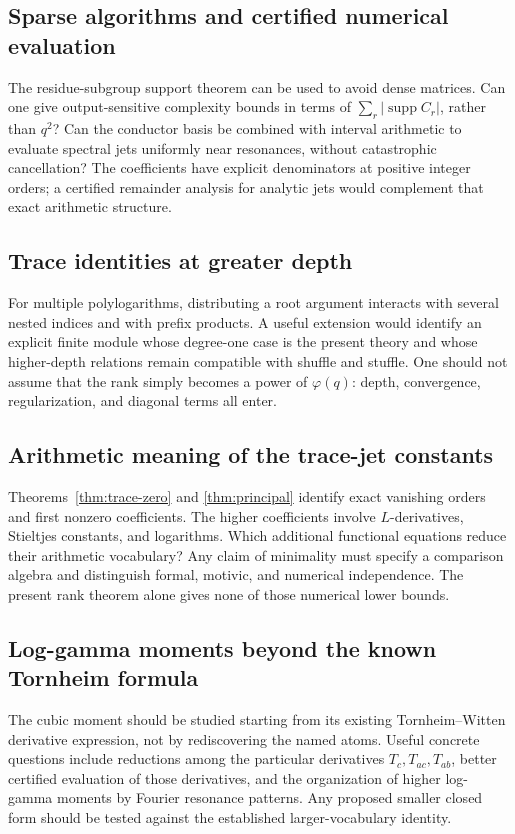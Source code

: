 \documentclass[11pt]{article}
\numberwithin{equation}{section}
\theoremstyle{definition}
\theoremstyle{remark}
\begin{document}
\subsection{Sparse algorithms and certified numerical evaluation}
The residue-subgroup support theorem can be used to avoid dense
matrices. Can one give output-sensitive complexity bounds in terms of
$\sum_r |\operatorname{supp}C_r|$, rather than $q^2$? Can the
conductor basis be combined with interval arithmetic to evaluate
spectral jets uniformly near resonances, without catastrophic
cancellation? The coefficients have explicit denominators at positive
integer orders; a certified remainder analysis for analytic jets would
complement that exact arithmetic structure.

\subsection{Trace identities at greater depth}
For multiple polylogarithms, distributing a root argument interacts
with several nested indices and with prefix products. A useful
extension would identify an explicit finite module whose degree-one
case is the present theory and whose higher-depth relations remain
compatible with shuffle and stuffle. One should not assume that the
rank simply becomes a power of $\varphi(q)$: depth, convergence,
regularization, and diagonal terms all enter.

\subsection{Arithmetic meaning of the trace-jet constants}
Theorems~\ref{thm:trace-zero} and \ref{thm:principal} identify exact
vanishing orders and first nonzero coefficients. The higher
coefficients involve $L$-derivatives, Stieltjes constants, and
logarithms. Which additional functional equations reduce their
arithmetic vocabulary? Any claim of minimality must specify a
comparison algebra and distinguish formal, motivic, and numerical
independence. The present rank theorem alone gives none of those
numerical lower bounds.

\subsection{Log-gamma moments beyond the known Tornheim formula}
The cubic moment should be studied starting from its existing
Tornheim--Witten derivative expression, not by rediscovering the named
atoms. Useful concrete questions include reductions among the
particular derivatives $T_c,T_{ac},T_{ab}$, better certified evaluation
of those derivatives, and the organization of higher log-gamma moments
by Fourier resonance patterns. Any proposed smaller closed form should
be tested against the established larger-vocabulary identity.
\end{document}
